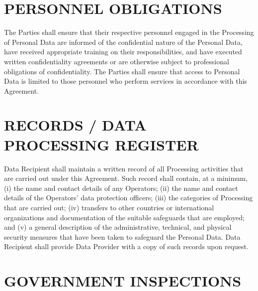 {\begin{enumerate}


\section{PERSONNEL OBLIGATIONS}

The Parties shall ensure that their respective personnel engaged in the Processing of Personal Data are informed of the confidential nature of the Personal Data, have received appropriate training on their responsibilities, and have executed written confidentiality agreements or are otherwise subject to professional obligations of confidentiality. The Parties shall ensure that access to Personal Data is limited to those personnel who perform services in accordance with this Agreement.

\section{RECORDS / DATA PROCESSING REGISTER}

Data Recipient shall maintain a written record of all Processing activities that are carried out under this Agreement. Such record shall contain, at a minimum, (i) the name and contact details of any Operators; (ii) the name and contact details of the Operators' data protection officers; (iii) the categories of Processing that are carried out; (iv) transfers to other countries or international organizations and documentation of the suitable safeguards that are employed; and (v) a general description of the administrative, technical, and physical security measures that have been taken to safeguard the Personal Data. Data Recipient shall provide Data Provider with a copy of such records upon request.

\section{GOVERNMENT INSPECTIONS}


\end{enumerate}}
